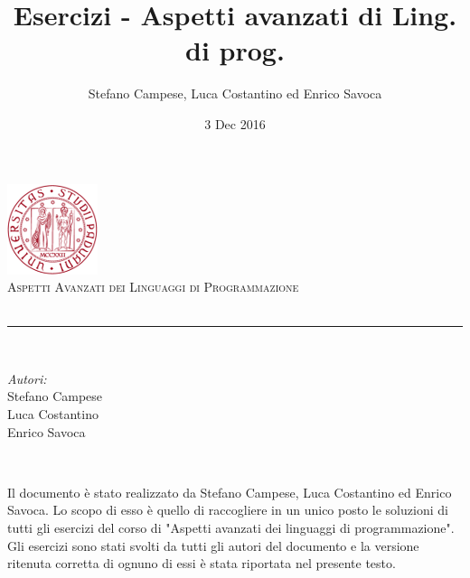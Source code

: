 \documentclass[12pt]{article}
\title{Esercizi - Aspetti avanzati di Ling. di prog.}                                %
\author{Stefano Campese, Luca Costantino ed Enrico Savoca}                               %
\date{3 Dec 2016}                                         %
\makeatletter
\let\thetitle\@title
\makeatother
\begin{document}

\begin{titlepage}
    \centering
    \vspace*{0.5 cm}
    \includegraphics[scale = 0.75]{logo.png}\\[1.0 cm]  %
    \textsc{\LARGE Aspetti Avanzati dei Linguaggi \newline\newline di Programmazione}\\[2.0 cm]  %
    { \huge \bfseries \thetitle}\\
    \rule{\linewidth}{0.2 mm} \\[1.5 cm]
    
    \begin{minipage}{0.4\textwidth}
        \begin{flushleft} \large
            \emph{Autori:}\\
            Stefano Campese\\
            Luca Costantino\\
            Enrico Savoca\\
        \end{flushleft}
    \end{minipage}~
    
    
    
    
    
    
    
\end{titlepage}

Il documento è stato realizzato da Stefano Campese, Luca Costantino ed Enrico Savoca. Lo scopo di esso è quello di raccogliere in un unico posto le soluzioni di tutti gli esercizi del corso di "Aspetti avanzati dei linguaggi di programmazione". Gli esercizi sono stati svolti da tutti gli autori del documento e la versione ritenuta corretta di ognuno di essi è stata riportata nel presente testo.


\tableofcontents 
\pagebreak

  



\newpage


\end{document}
